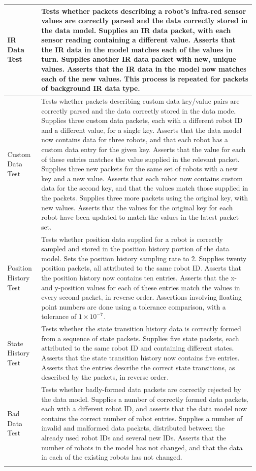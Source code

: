 \begin{longtable}{ l p{10cm} }
\hline
 IR Data Test & Tests whether packets describing a robot's infra-red sensor values are correctly parsed and the data correctly stored in the data model. Supplies an IR data packet, with each sensor reading containing a different value. Asserts that the IR data in the model matches each of the values in turn. Supplies another IR data packet with new, unique values. Asserts that the IR data in the model now matches each of the new values. This process is repeated for packets of background IR data type.\\
\hline
 Custom Data Test & Tests whether packets describing custom data key/value pairs are correctly parsed and the data correctly stored in the data mode. Supplies three custom data packets, each with a different robot ID and a different value, for a single key. Asserts that the data model now contains data for three robots, and that each robot has a custom data entry for the given key. Asserts that the value for each of these entries matches the value supplied in the relevant packet. Supplies three new packets for the same set of robots with a new key and a new value. Asserts that each robot now contains custom data for the second key, and that the values match those supplied in the packets. Supplies three more packets using the original key, with new values. Asserts that the values for the original key for each robot have been updated to match the values in the latest packet set.\\
\hline
 Position History Test & Tests whether position data supplied for a robot is correctly sampled and stored in the position history portion of the data model. Sets the position history sampling rate to 2. Supplies twenty position packets, all attributed to the same robot ID. Asserts that the position history now contains ten entries. Asserts that the x- and y-position values for each of these entries match the values in every second packet, in reverse order. Assertions involving floating point numbers are done using a tolerance comparison, with a tolerance of $ 1 \times 10^{-7} $.\\
\hline
 State History Test & Tests whether the state transition history data is correctly formed from a sequence of state packets. Supplies five state packets, each attributed to the same robot ID and containing different states. Asserts that the state transition history now contains five entries. Asserts that the entries describe the correct state transitions, as described by the packets, in reverse order.\\
\hline
 Bad Data Test & Tests whether badly-formed data packets are correctly rejected by the data model. Supplies a number of correctly formed data packets, each with a different robot ID, and asserts that the data model now contains the correct number of robot entries. Supplies a number of invalid and malformed data packets, distributed between the already used robot IDs and several new IDs. Asserts that the number of robots in the model has not changed, and that the data in each of the existing robots has not changed.\\
 \bottomrule\\


\end{longtable}
